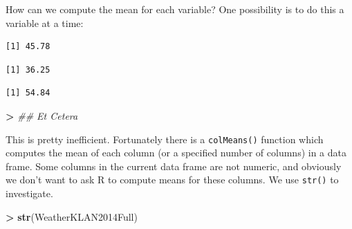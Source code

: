 \documentclass[]{krantz}
\makeatletter
\newenvironment{Shaded}{\begin{snugshade}}{\end{snugshade}}
\newcommand{\CommentTok}[1]{\textcolor[rgb]{0.37,0.37,0.37}{\textit{#1}}}
\newcommand{\KeywordTok}[1]{\textcolor[rgb]{0.27,0.27,0.27}{\textbf{#1}}}
\newcommand{\NormalTok}[1]{#1}
\newcommand{\OperatorTok}[1]{\textcolor[rgb]{0.43,0.43,0.43}{\textbf{#1}}}
\newcommand{\StringTok}[1]{\textcolor[rgb]{0.5,0.5,0.5}{#1}}
\newenvironment{kframe}{%
\medskip{}
\setlength{\fboxsep}{.8em}
 \def\at@end@of@kframe{}%
 \ifinner\ifhmode%
  \def\at@end@of@kframe{\end{minipage}}%
  \begin{minipage}{\columnwidth}%
 \fi\fi%
 \def\FrameCommand##1{\hskip\@totalleftmargin \hskip-\fboxsep
 \colorbox{shadecolor}{##1}\hskip-\fboxsep
     \hskip-\linewidth \hskip-\@totalleftmargin \hskip\columnwidth}%
 \MakeFramed {\advance\hsize-\width
   \@totalleftmargin\z@ \linewidth\hsize
   \@setminipage}}%
 {\par\unskip\endMakeFramed%
 \at@end@of@kframe}
\renewenvironment{Shaded}{\begin{kframe}}{\end{kframe}}
\makeatother
\begin{document}
How can we compute the mean for each variable? One possibility is to do this a variable at a time:

\begin{Shaded}
\end{Shaded}

\begin{verbatim}
[1] 45.78
\end{verbatim}

\begin{Shaded}
\end{Shaded}

\begin{verbatim}
[1] 36.25
\end{verbatim}

\begin{Shaded}
\end{Shaded}

\begin{verbatim}
[1] 54.84
\end{verbatim}

\begin{Shaded}
\begin{Highlighting}[]
\OperatorTok{>}\StringTok{ }\CommentTok{## Et Cetera}
\end{Highlighting}
\end{Shaded}

This is pretty inefficient. Fortunately there is a \texttt{colMeans()} function which computes the mean of each column (or a specified number of columns) in a data frame. Some columns in the current data frame are not numeric, and obviously we don't want to ask R to compute means for these columns. We use \texttt{str()} to investigate.

\begin{Shaded}
\begin{Highlighting}[]
\OperatorTok{>}\StringTok{ }\KeywordTok{str}\NormalTok{(WeatherKLAN2014Full)}
\end{Highlighting}
\end{Shaded}
\end{document}
